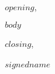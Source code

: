 \documentclass[$fontsize$,letterpaper]{letter}
\begin{document}
\begin{letter}{}
\pagestyle{empty}

\opening{$opening$,}

$body$

\closing{$closing$,\\
  \\
  $signedname$
}

\end{letter}
\end{document}
